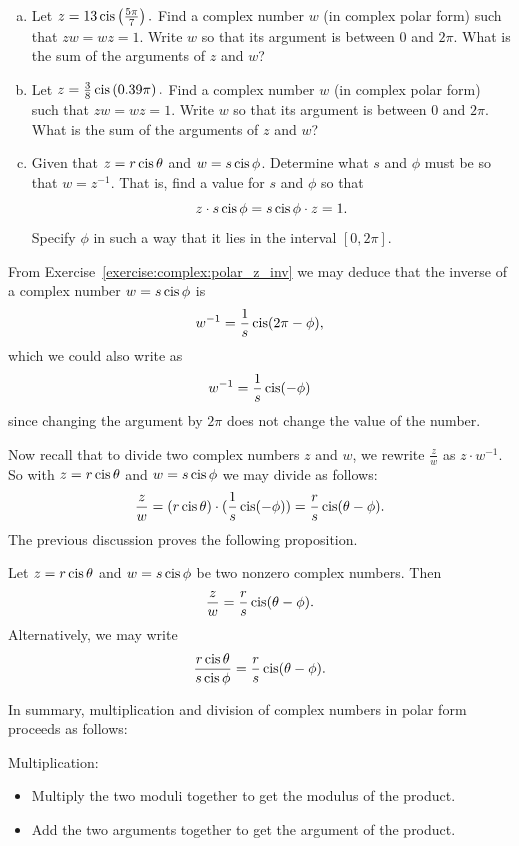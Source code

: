 {\begin{exercise}\label{exercise:complex:polar_z_inv}
\begin{enumerate}[(a)]
\item
Let $z = 13 \operatorname{cis}\left(\frac{5\pi}{7}\right).$ Find a complex number $w$ (in complex polar form) such that $zw = wz = 1$. Write $w$ so that its argument is between $0$ and $2\pi$. What is the sum of the arguments of $z$ and $w$?
\item
Let $z = \frac{3}{8} \operatorname{cis}\left(0.39\pi\right).$ Find a complex number $w$ (in complex polar form) such that $zw = wz = 1$. Write $w$ so that its argument is between $0$ and $2\pi$. What is the sum of the arguments of $z$ and $w$?
\item
Given that $z=r\operatorname{cis}\theta$ and $w=s\operatorname{cis}\phi$.  Determine what $s$ and $\phi$ must be so that $w = z^{-1}$.  That is, find a value for $s$ and $\phi$ so that 
\[ z \cdot s\operatorname{cis}\phi = s\operatorname{cis}\phi \cdot z = 1.\]
Specify $\phi$ in such a way that it lies in the interval $[0,2\pi]$.
\end{enumerate}
\end{exercise}


\medskip{}
\noindent
From Exercise~\ref{exercise:complex:polar_z_inv} we may deduce that the inverse of a complex number $w = s \operatorname{cis} \phi$ is
\[ w^{-1} = \frac{1}{s}\operatorname{cis}(2\pi -\phi), \]
which we could also write as
\[ w^{-1} = \frac{1}{s}\operatorname{cis}(-\phi) \]
since changing the argument by $2\pi$ does not change the value of the number.

Now recall that to divide two complex numbers $z$ and $w$, we rewrite $\frac{z}{w}$ as $z \cdot w^{-1}$.  
So with $z=r\operatorname{cis}\theta$ and $w=s\operatorname{cis}\phi$ we may divide as follows:  
\[ \frac{z}{w} = (r\operatorname{cis}\theta) \cdot (\frac{1}{s}\operatorname{cis}(-\phi)) = \frac{r}{s}\operatorname{cis}(\theta - \phi). \]
The previous discussion proves the following proposition.

\begin{prop}\label{proposition:complex:polar_div}
Let $z=r\operatorname{cis}\theta$ and $w=s\operatorname{cis}\phi$ be two nonzero complex numbers. Then
 \[ \frac{z}{w} = \frac{r}{s}\operatorname{cis}(\theta - \phi).\]
 Alternatively, we may write
 \[ \frac{r \operatorname{cis} \theta}{s \operatorname{cis} \phi} = \frac{r}{s}\operatorname{cis}(\theta - \phi).\]
 \end{prop}

\noindent
In summary, multiplication and division of complex numbers in polar form proceeds as follows:

\medskip{}
\noindent
Multiplication:
\begin{itemize}
\item
Multiply the two moduli together to get the modulus of the product.
\item
Add the two arguments together to get the argument of the product.
\end{itemize}

}
